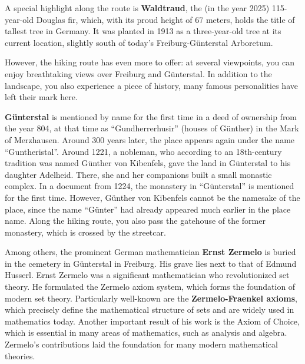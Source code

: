 \documentclass[landscape, a4paper]{article}
\newcommand\alert[1]{\textcolor{PrimaryColor}{\textbf{#1}}}
\begin{document}
\begin{minipage}[t]{0.31\textwidth}
  A special highlight along the route is \alert{Waldtraud}, the (in the year 2025) 115-year-old Douglas fir, which, with its proud height of 67 meters, holds the title of tallest tree in Germany. It was planted in 1913 as a three-year-old tree at its current location, slightly south of today's Freiburg-Günterstal Arboretum.

However, the hiking route has even more to offer: at several viewpoints, you can enjoy breathtaking views over Freiburg and Günterstal. In addition to the landscape, you also experience a piece of history, many famous personalities have left their mark here.

\end{minipage}%
\hfill\color{white}%
\vrule width 0.01cm
\hfill\color{black}%
\begin{minipage}[t]{0.31\textwidth}
	\setlength{\parskip}{0.25cm}

  \alert{Günterstal} is mentioned by name for the first time in a deed of ownership from the year 804, at that time as \enquote{Gundherrerhusir} (houses of Günther) in the Mark of Merzhausen. Around 300 years later, the place appears again under the name \enquote{Guntheristal}. Around 1221, a nobleman, who according to an 18th-century tradition was named Günther von Kibenfels, gave the land in Günterstal to his daughter Adelheid. There, she and her companions built a small monastic complex. In a document from 1224, the monastery in \enquote{Günterstal} is mentioned for the first time. However, Günther von Kibenfels cannot be the namesake of the place, since the name \enquote{Günter} had already appeared much earlier in the place name. Along the hiking route, you also pass the gatehouse of the former monastery, which is crossed by the streetcar.

  Among others, the prominent German mathematician \alert{Ernst Zermelo} is buried in the cemetery in Günterstal in Freiburg. His grave lies next to that of Edmund Husserl. Ernst Zermelo was a significant mathematician who revolutionized set theory. He formulated the Zermelo axiom system, which forms the foundation of modern set theory. Particularly well-known are the \alert{Zermelo-Fraenkel axioms}, which precisely define the mathematical structure of sets and are widely used in mathematics today. Another important result of his work is the Axiom of Choice, which is essential in many areas of mathematics, such as analysis and algebra. Zermelo's contributions laid the foundation for many modern mathematical theories.


\end{minipage}
\end{document}
